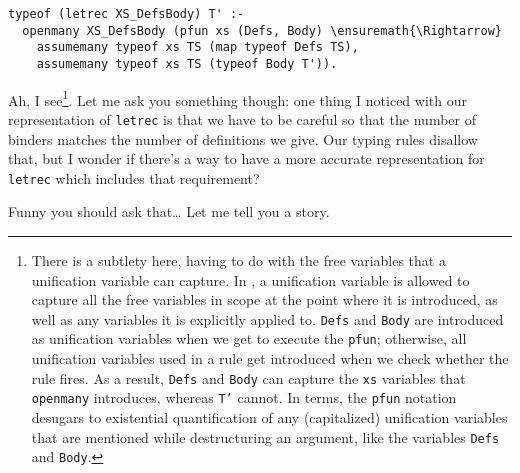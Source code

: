 \begin{verbatim}
typeof (letrec XS_DefsBody) T' :-
  openmany XS_DefsBody (pfun xs (Defs, Body) \ensuremath{\Rightarrow}
    assumemany typeof xs TS (map typeof Defs TS),
    assumemany typeof xs TS (typeof Body T')).
\end{verbatim}

\heroSTUDENT{} Ah, I
see\footnote{There is a subtlety here, having to do with the free variables that a unification variable
can capture. In \lamprolog, a unification variable is allowed to capture all the free variables in scope at the
point where it is introduced, as well as any variables it is explicitly applied to. \texttt{Defs} and \texttt{Body} are introduced as unification variables when we get to execute the \texttt{pfun}; otherwise, all unification variables used in a rule get introduced when we check whether the rule fires. As a result, \texttt{Defs} and \texttt{Body} can capture the \texttt{xs} variables that \texttt{openmany} introduces, whereas \texttt{T'} cannot. In \lamprolog terms, the \texttt{pfun} notation desugars to existential quantification of any (capitalized) unification variables that are mentioned while destructuring an argument, like the variables \texttt{Defs} and \texttt{Body}.}.
Let me ask you something though: one thing I noticed with our
representation of \texttt{letrec} is that we have to be careful so that
the number of binders matches the number of definitions we give. Our
typing rules disallow that, but I wonder if there's a way to have a more
accurate representation for \texttt{letrec} which includes that
requirement?

\heroADVISOR{} Funny you should ask that\ldots{} Let me tell you a story.
